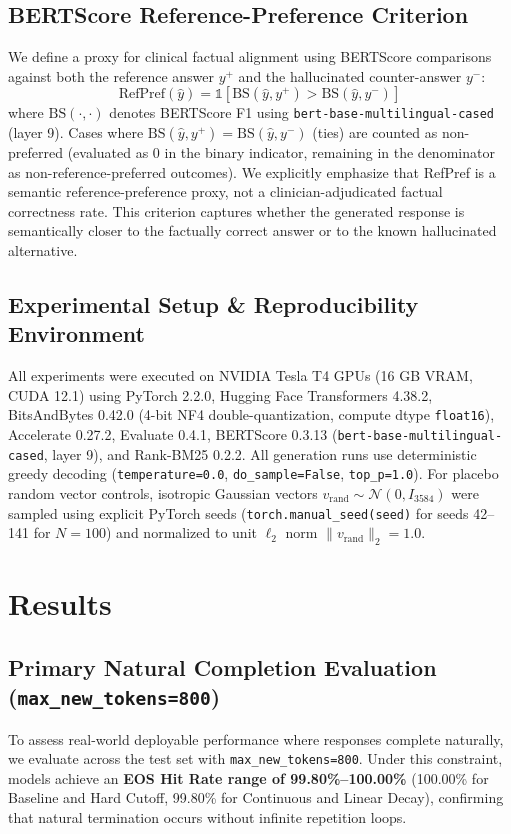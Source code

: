 \documentclass[conference]{IEEEtran}
\begin{document}
\subsection{BERTScore Reference-Preference Criterion}
We define a proxy for clinical factual alignment using BERTScore \cite{ref16} comparisons against both the reference answer $y^+$ and the hallucinated counter-answer $y^-$:
\begin{equation}
\text{RefPref}(\hat{y}) = \mathbb{1}\left[\text{BS}(\hat{y}, y^+) > \text{BS}(\hat{y}, y^-)\right]
\end{equation}
where $\text{BS}(\cdot,\cdot)$ denotes BERTScore F1 using \texttt{bert-base-multilingual-cased} (layer 9). Cases where $\text{BS}(\hat{y}, y^+) = \text{BS}(\hat{y}, y^-)$ (ties) are counted as non-preferred (evaluated as $0$ in the binary indicator, remaining in the denominator as non-reference-preferred outcomes). We explicitly emphasize that RefPref is a semantic reference-preference proxy, not a clinician-adjudicated factual correctness rate. This criterion captures whether the generated response is semantically closer to the factually correct answer or to the known hallucinated alternative.

\subsection{Experimental Setup \& Reproducibility Environment}
All experiments were executed on NVIDIA Tesla T4 GPUs (16 GB VRAM, CUDA 12.1) using PyTorch 2.2.0, Hugging Face Transformers 4.38.2, BitsAndBytes 0.42.0 (4-bit NF4 double-quantization, compute dtype \texttt{float16}), Accelerate 0.27.2, Evaluate 0.4.1, BERTScore 0.3.13 (\texttt{bert-base-multilingual-cased}, layer 9), and Rank-BM25 0.2.2. All generation runs use deterministic greedy decoding (\texttt{temperature=0.0}, \texttt{do\_sample=False}, \texttt{top\_p=1.0}). For placebo random vector controls, isotropic Gaussian vectors $v_{\text{rand}} \sim \mathcal{N}(0, I_{3584})$ were sampled using explicit PyTorch seeds (\texttt{torch.manual\_seed(seed)} for seeds 42--141 for $N=100$) and normalized to unit $\ell_2$ norm $\|v_{\text{rand}}\|_2 = 1.0$.

\section{Results}

\subsection{Primary Natural Completion Evaluation (\texttt{max\_new\_tokens=800})}
To assess real-world deployable performance where responses complete naturally, we evaluate across the test set with \texttt{max\_new\_tokens=800}. Under this constraint, models achieve an \textbf{EOS Hit Rate range of 99.80\%--100.00\%} (100.00\% for Baseline and Hard Cutoff, 99.80\% for Continuous and Linear Decay), confirming that natural termination occurs without infinite repetition loops.
\end{document}
